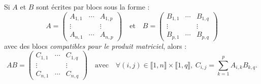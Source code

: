 \documentclass[french]{article}
\theoremstyle{plain}
\theoremstyle{definition}
\theoremstyle{remark}
\begin{document}
\begin{prop}%
	Si $A$ et $B$ sont écrites par blocs sous la forme :
	$$A=\begin{pmatrix}
		A_{1,1}&\cdots&A_{1,p}\\
		\vdots&&\vdots\\
		A_{n,1}&\cdots&A_{n,p}
	\end{pmatrix}\quad\text{et}\quad B=\begin{pmatrix}
	B_{1,1}&\cdots&B_{1,q}\\
	\vdots&&\vdots\\
	B_{p,1}&\cdots&B_{p,q}
	\end{pmatrix}$$ avec des blocs \textit{compatibles pour le produit matriciel}, alors :
	$$AB=\begin{pmatrix}
		C_{1,1}&\cdots&C_{1,q}\\
		\vdots&&\vdots\\
		C_{n,1}&\cdots&C_{n,q}
	\end{pmatrix}\quad\text{avec}\quad\forall (i,j)\in\llbracket1,n\rrbracket\times\llbracket1,q\rrbracket,\ C_{i,j}=\sum_{k=1}^{p}A_{i,k}B_{k,q}.$$
\end{prop}
\end{document}
